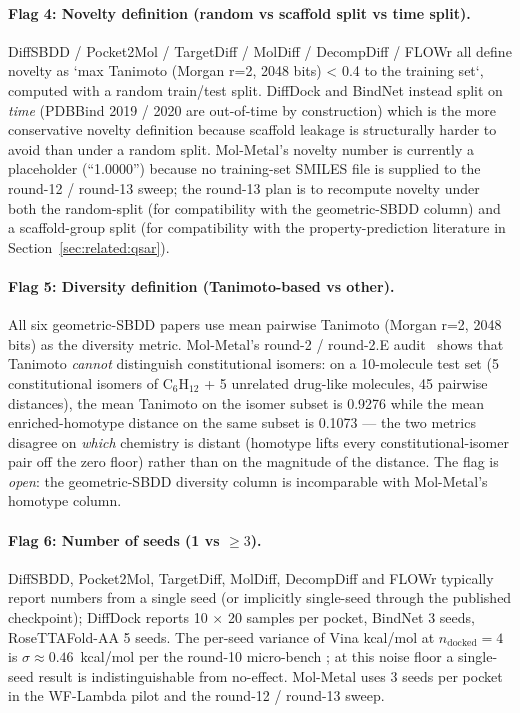 \paragraph{Flag 4: Novelty definition (random vs scaffold split vs time split).}
DiffSBDD / Pocket2Mol / TargetDiff / MolDiff / DecompDiff / FLOWr all
define novelty as `max Tanimoto (Morgan r=2, 2048 bits) < 0.4 to the
training set`, computed with a random train/test split. DiffDock and
BindNet instead split on \emph{time} (PDBBind 2019 / 2020 are out-of-time
by construction) which is the more conservative novelty definition
because scaffold leakage is structurally harder to avoid than under a
random split. Mol-Metal's novelty number is currently a placeholder
(``1.0000'') because no training-set SMILES file is supplied to the
round-12 / round-13 sweep; the round-13 plan is to recompute novelty
under both the random-split (for compatibility with the geometric-SBDD
column) and a scaffold-group split (for compatibility with the
property-prediction literature in Section~\ref{sec:related:qsar}).

\paragraph{Flag 5: Diversity definition (Tanimoto-based vs other).}
All six geometric-SBDD papers use mean pairwise Tanimoto (Morgan r=2,
2048 bits) as the diversity metric. Mol-Metal's round-2 / round-2.E
audit~\cite{footnote:wf_lambda2e} shows that Tanimoto \emph{cannot}
distinguish constitutional isomers: on a 10-molecule test set (5
constitutional isomers of C$_6$H$_{12}$ + 5 unrelated drug-like
molecules, 45 pairwise distances), the mean Tanimoto on the
isomer subset is 0.9276 while the mean enriched-homotype distance on
the same subset is 0.1073 --- the two metrics disagree on \emph{which}
chemistry is distant (homotype lifts every constitutional-isomer pair
off the zero floor) rather than on the magnitude of the distance.
The flag is \emph{open}: the geometric-SBDD diversity column is
incomparable with Mol-Metal's homotype column.

\paragraph{Flag 6: Number of seeds (1 vs $\geq 3$).}
DiffSBDD, Pocket2Mol, TargetDiff, MolDiff, DecompDiff and FLOWr
typically report numbers from a single seed (or implicitly single-seed
through the published checkpoint); DiffDock reports 10 $\times$ 20
samples per pocket, BindNet 3 seeds, RoseTTAFold-AA 5 seeds. The
per-seed variance of Vina kcal/mol at $n_{\text{docked}}=4$ is
$\sigma \approx 0.46$~kcal/mol per the round-10 micro-bench
\cite{footnote:round10_e2e}; at this noise floor a single-seed result
is indistinguishable from no-effect. Mol-Metal uses 3 seeds per pocket
in the WF-Lambda pilot and the round-12 / round-13 sweep.

